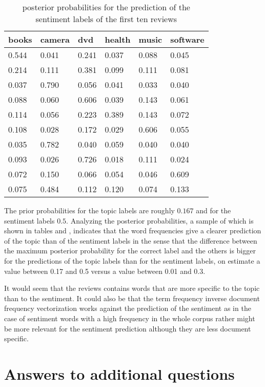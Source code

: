 \documentclass[11pt]{article}
\begin{document}
\begin{table}[h]\footnotesize
\begin{tabular}{ l l l l l l }
books & camera & dvd & health & music & software \\
\hline
0.544 & 0.041 & 0.241 & 0.037 & 0.088 & 0.045 \\
0.214 & 0.111 & 0.381 & 0.099 & 0.111 & 0.081 \\
0.037 & 0.790 & 0.056 & 0.041 & 0.033 & 0.040 \\
0.088 & 0.060 & 0.606 & 0.039 & 0.143 & 0.061 \\
0.114 & 0.056 & 0.223 & 0.389 & 0.143 & 0.072 \\
0.108 & 0.028 & 0.172 & 0.029 & 0.606 & 0.055 \\
0.035 & 0.782 & 0.040 & 0.059 & 0.040 & 0.040 \\
0.093 & 0.026 & 0.726 & 0.018 & 0.111 & 0.024 \\
0.072 & 0.150 & 0.066 & 0.054 & 0.046 & 0.609 \\
0.075 & 0.484 & 0.112 & 0.120 & 0.074 & 0.133 \\
\end{tabular}
\caption{posterior probabilities for the prediction of the sentiment labels of the first ten reviews}
\end{table}

The prior probabilities for the topic labels are roughly $0.167$ and for the sentiment labels $0.5$. Analyzing the posterior probabilities, a sample of which is shown in tables  and , indicates that the word frequencies give a clearer prediction of the topic than of the sentiment labels in the sense that the difference between the maximum posterior probability for the correct label and the others is bigger for the predictions of the topic labels than for the sentiment labels, on estimate a value between 0.17 and 0.5 versus a value between 0.01 and 0.3.

It would seem that the reviews contains words that are more specific to the topic than to the sentiment. It could also be that the term frequency inverse document frequency vectorization works against the prediction of the sentiment as in the case of sentiment words with a high frequency in the whole corpus rather might be more relevant for the sentiment prediction although they are less document specific.

\section{Answers to additional questions}
\end{document}
